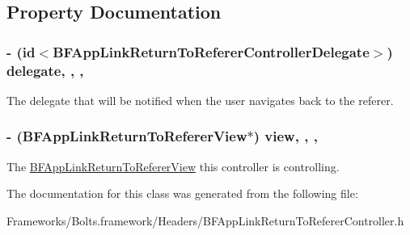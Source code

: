 \subsection{Property Documentation}
\hypertarget{interface_b_f_app_link_return_to_referer_controller_a314cd7219fab9e64981a67e3bf99c6d6}{}
\subsubsection[{delegate}]{\setlength{\rightskip}{0pt plus 5cm}-\/ (id$<${\bf B\+F\+App\+Link\+Return\+To\+Referer\+Controller\+Delegate}$>$) delegate\hspace{0.3cm}{\ttfamily [read]}, {\ttfamily [write]}, {\ttfamily [nonatomic]}, {\ttfamily [weak]}}\label{interface_b_f_app_link_return_to_referer_controller_a314cd7219fab9e64981a67e3bf99c6d6}
The delegate that will be notified when the user navigates back to the referer. \hypertarget{interface_b_f_app_link_return_to_referer_controller_af28b223c0c9a782847fdf45e934a2009}{}
\subsubsection[{view}]{\setlength{\rightskip}{0pt plus 5cm}-\/ ({\bf B\+F\+App\+Link\+Return\+To\+Referer\+View}$\ast$) view\hspace{0.3cm}{\ttfamily [read]}, {\ttfamily [write]}, {\ttfamily [nonatomic]}, {\ttfamily [strong]}}\label{interface_b_f_app_link_return_to_referer_controller_af28b223c0c9a782847fdf45e934a2009}
The \hyperlink{interface_b_f_app_link_return_to_referer_view}{B\+F\+App\+Link\+Return\+To\+Referer\+View} this controller is controlling. 

The documentation for this class was generated from the following file\+:\begin{DoxyCompactItemize}
\item 
Frameworks/\+Bolts.\+framework/\+Headers/B\+F\+App\+Link\+Return\+To\+Referer\+Controller.\+h\end{DoxyCompactItemize}
